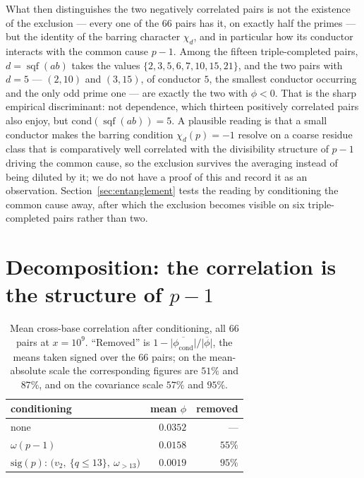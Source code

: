 \documentclass[11pt,reqno]{amsart}
\theoremstyle{plain}
\theoremstyle{definition}
\DeclareMathOperator{\sqf}{sqf}
\begin{document}
What then distinguishes the two negatively correlated pairs is not the
existence of the exclusion --- every one of the $66$ pairs has it, on exactly
half the primes --- but the identity of the barring character $\chi_d$, and in
particular how its conductor interacts with the common cause $p-1$. Among the
fifteen triple-completed pairs, $d = \sqf(ab)$ takes the values
$\{2, 3, 5, 6, 7, 10, 15, 21\}$, and the two pairs with $d = 5$ ---
$(2,10)$ and $(3,15)$, of conductor $5$, the smallest conductor occurring and
the only odd prime one --- are exactly the two with $\phi < 0$. That is the
sharp empirical discriminant: not dependence, which thirteen positively
correlated pairs also enjoy, but $\mathrm{cond}(\sqf(ab)) = 5$. A plausible
reading is that a small conductor makes the barring condition
$\chi_d(p) = -1$ resolve on a coarse residue class that is comparatively well
correlated with the divisibility structure of $p-1$ driving the common cause,
so the exclusion survives the averaging instead of being diluted by it; we do
not have a proof of this and record it as an observation.
Section~\ref{sec:entanglement} tests the reading by conditioning the common
cause away, after which the exclusion becomes visible on six triple-completed pairs rather than two.

\section{Decomposition: the correlation is the structure of \texorpdfstring{$p-1$}{p-1}}
\label{sec:decomposition}

\begin{table}[t]
\centering
\caption{Mean cross-base correlation after conditioning, all $66$ pairs at
$x = 10^9$. ``Removed'' is
$1 - \lvert\overline{\phi_{\mathrm{cond}}}\rvert / \lvert\overline{\phi}\rvert$,
the means taken signed over the $66$ pairs; on the mean-absolute scale the
corresponding figures are $51\%$ and $87\%$, and on the covariance scale
$57\%$ and $95\%$.}
\label{tab:decomp}
\begin{tabular}{lrr}
\toprule
conditioning & mean $\phi$ & removed \\
\midrule
none & $0.0352$ & --- \\
$\omega(p-1)$ & $0.0158$ & $55\%$ \\
$\mathrm{sig}(p)$: $\bigl(v_2,\ \{q \le 13\},\ \omega_{>13}\bigr)$
  & $0.0019$ & $95\%$ \\
\bottomrule
\end{tabular}
\end{table}
\end{document}
